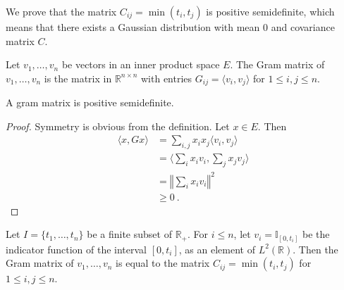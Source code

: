 




We prove that the matrix $C_{ij} = \min(t_i, t_j)$ is positive semidefinite, which means that there exists a Gaussian distribution with mean 0 and covariance matrix $C$.

\begin{definition}\label{def:gramMatrix}
  \leanok
Let $v_1, \ldots, v_n$ be vectors in an inner product space $E$.
The Gram matrix of $v_1, \ldots, v_n$ is the matrix in $\mathbb{R}^{n \times n}$ with entries $G_{ij} = \langle v_i, v_j \rangle$ for $1 \leq i,j \leq n$.
\end{definition}


\begin{lemma}\label{lem:posSemidef_gramMatrix}
  \leanok
A gram matrix is positive semidefinite.
\end{lemma}

\begin{proof}\leanok
Symmetry is obvious from the definition.
Let $x \in E$. Then
\begin{align*}
  \langle x, G x \rangle
  &= \sum_{i,j} x_i x_j \langle v_i, v_j \rangle
  \\
  &= \langle \sum_i x_i v_i, \sum_j x_j v_j \rangle
  \\
  &= \left\Vert \sum_i x_i v_i \right\Vert^2
  \\
  &\ge 0
  \: .
\end{align*}
\end{proof}


\begin{lemma}\label{lem:C_eq_gramMatrix}
  \leanok
Let $I = \{t_1, \ldots, t_n\}$ be a finite subset of $\mathbb{R}_+$.
For $i \le n$, let $v_i = \mathbb{I}_{[0, t_i]}$ be the indicator function of the interval $[0, t_i]$, as an element of $L^2(\mathbb{R})$.
Then the Gram matrix of $v_1, \ldots, v_n$ is equal to the matrix $C_{ij} = \min(t_i, t_j)$ for $1 \leq i,j \leq n$.
\end{lemma}

